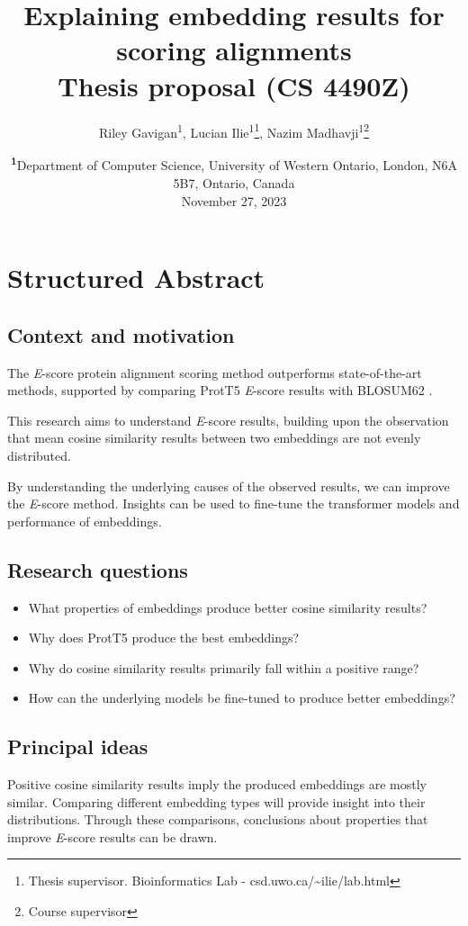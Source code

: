 \documentclass[
	letterpaper, %
	10pt, %
]{journalArticle}
\title{Explaining embedding results for scoring alignments\\ Thesis proposal (CS 4490Z)}
\author{
	Riley Gavigan\textsuperscript{1}, Lucian Ilie\textsuperscript{1}\thanks{Thesis supervisor. Bioinformatics Lab - csd.uwo.ca/\textasciitilde ilie/lab.html}, Nazim Madhavji\textsuperscript{1}\thanks{Course supervisor}\\
}
\date{{\footnotesize{\textsuperscript{\textbf{1}}Department of Computer Science, University of Western Ontario, London, N6A 5B7, Ontario, Canada\\}}\vspace{1em}November 27, 2023\\}
\begin{document}
\maketitle %
\section{Structured Abstract}

\subsection{Context and motivation}
The \textit{E}-score protein alignment scoring method \autocite{Ashrafzadeh:2023} outperforms state-of-the-art methods, supported by comparing ProtT5 \autocite{Elnaggar:2021} \textit{E}-score results with BLOSUM62 \autocite{Henikoff:1992}.

This research aims to understand \textit{E}-score results, building upon the observation that mean cosine similarity results between two embeddings are not evenly distributed.

By understanding the underlying causes of the observed results, we can improve the \textit{E}-score method. Insights can be used to fine-tune the transformer models \autocite{Elnaggar:2021, Rives:2021} and performance of embeddings.

\subsection{Research questions}
\begin{itemize}
    \item{What properties of embeddings produce better cosine similarity results?}
    \item{Why does ProtT5 produce the best embeddings?}
    \item{Why do cosine similarity results primarily fall within a positive range?}
    \item{How can the underlying models be fine-tuned to produce better embeddings?}
\end{itemize}

\subsection{Principal ideas}
Positive cosine similarity results imply the produced embeddings are mostly similar. Comparing different embedding types will provide insight into their distributions. Through these comparisons, conclusions about properties that improve \textit{E}-score results can be drawn.
\end{document}
